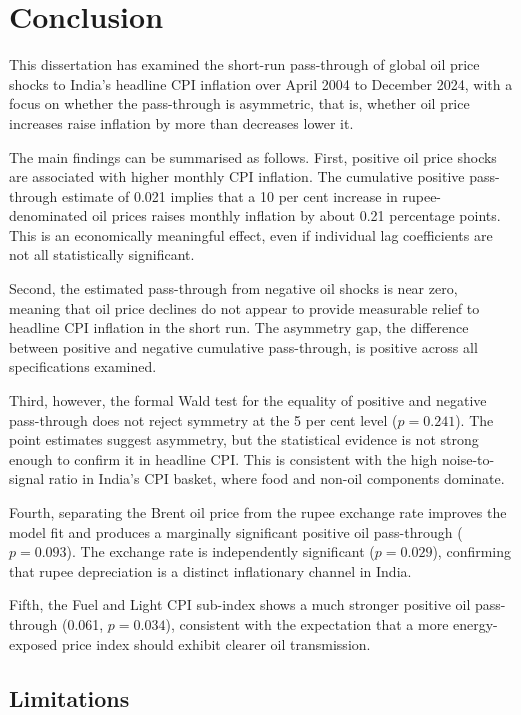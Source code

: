 \chapter{Conclusion}
\label{ch:conclusion}

This dissertation has examined the short-run pass-through of global oil price shocks to India's headline CPI inflation over April 2004 to December 2024, with a focus on whether the pass-through is asymmetric, that is, whether oil price increases raise inflation by more than decreases lower it.

The main findings can be summarised as follows. First, positive oil price shocks are associated with higher monthly CPI inflation. The cumulative positive pass-through estimate of 0.021 implies that a 10 per cent increase in rupee-denominated oil prices raises monthly inflation by about 0.21 percentage points. This is an economically meaningful effect, even if individual lag coefficients are not all statistically significant.

Second, the estimated pass-through from negative oil shocks is near zero, meaning that oil price declines do not appear to provide measurable relief to headline CPI inflation in the short run. The asymmetry gap, the difference between positive and negative cumulative pass-through, is positive across all specifications examined.

Third, however, the formal Wald test for the equality of positive and negative pass-through does not reject symmetry at the 5 per cent level ($p = 0.241$). The point estimates suggest asymmetry, but the statistical evidence is not strong enough to confirm it in headline CPI. This is consistent with the high noise-to-signal ratio in India's CPI basket, where food and non-oil components dominate.

Fourth, separating the Brent oil price from the rupee exchange rate improves the model fit and produces a marginally significant positive oil pass-through ($p = 0.093$). The exchange rate is independently significant ($p = 0.029$), confirming that rupee depreciation is a distinct inflationary channel in India.

Fifth, the Fuel and Light CPI sub-index shows a much stronger positive oil pass-through (0.061, $p = 0.034$), consistent with the expectation that a more energy-exposed price index should exhibit clearer oil transmission.

\section{Limitations}

